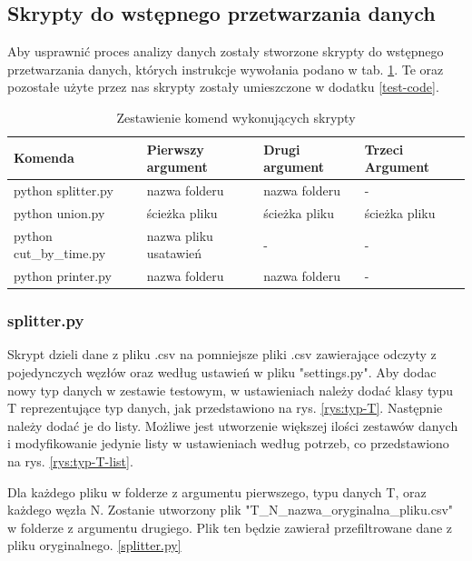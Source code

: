 \documentclass[12pt,oneside,a4paper]{book}
\theoremstyle{break}
\begin{document}
\subsection{Skrypty do wstępnego przetwarzania danych}
Aby usprawnić proces analizy danych zostały stworzone skrypty do wstępnego przetwarzania danych, 
których instrukcje wywołania podano w tab. \ref{tab:test-commands}.
Te oraz pozostałe użyte przez nas skrypty zostały umieszczone w dodatku \ref*{test-code}.

\begin{table}[ht]
    \centering
    \begin{tabularx}{\textwidth}{|X | X | X | X|}
        \hline
        Komenda & Pierwszy argument & Drugi argument & Trzeci Argument \\
        \hline
        python splitter.py & nazwa folderu & nazwa folderu & - \\
        \hline
        python union.py & ścieżka pliku & ścieżka pliku & ścieżka pliku \\
        \hline
        python cut\_by\_time.py & nazwa pliku usatawień & - & - \\
        \hline
        python printer.py & nazwa folderu & nazwa folderu & - \\
        \hline
        \end{tabularx}
        \caption{Zestawienie komend wykonujących skrypty}
        \label{tab:test-commands}
\end{table}

\subsubsection{splitter.py}
Skrypt dzieli dane z pliku .csv na pomniejsze pliki .csv 
zawierające odczyty z pojedynczych węzłów oraz według ustawień 
w pliku "settings.py".
Aby dodac nowy typ danych w zestawie testowym, w ustawieniach 
należy dodać klasy typu T reprezentujące typ danych,
jak przedstawiono na rys. \ref{rys:typ-T}. Następnie należy 
dodać je do listy. Możliwe jest utworzenie większej ilości
zestawów danych i modyfikowanie jedynie listy w ustawieniach 
według potrzeb, co przedstawiono na rys. \ref{rys:typ-T-list}.
\par Dla każdego pliku w folderze z argumentu pierwszego, typu danych T, oraz każdego węzła N.
Zostanie utworzony plik "T\_N\_nazwa\_oryginalna\_pliku.csv" w folderze z argumentu drugiego.
Plik ten będzie zawierał przefiltrowane dane z pliku oryginalnego. \ref*{splitter.py}
\end{document}
